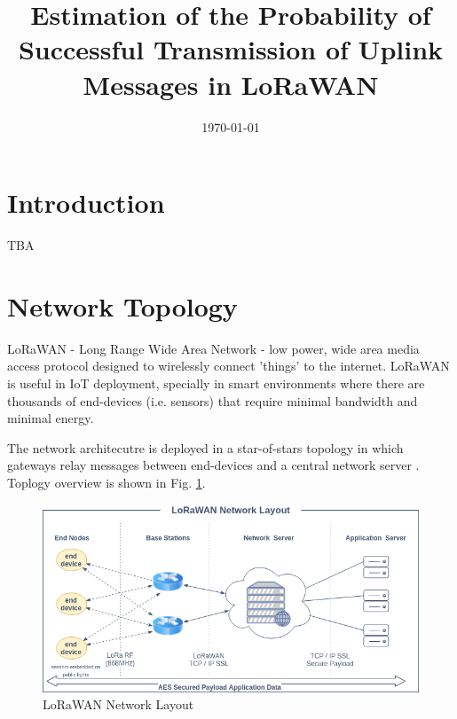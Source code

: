 \documentclass[11pt, a4paper]{article} %
\title{Estimation of the Probability of Successful Transmission of Uplink Messages in LoRaWAN} %
\author{
	\authorstyle{Ante Lojić Kapetanović}
	\newline\newline %
	\institution{University of Split, Split, Croatia}
}
\date{\today} %
\begin{document}
\maketitle %

\thispagestyle{firstpage} %




\section{Introduction}
TBA

\section{Network Topology}

LoRaWAN - Long Range Wide Area Network - low power, wide area media access protocol designed to wirelessly connect 'things' to the internet. LoRaWAN is useful in IoT deployment, specially in smart environments where there are thousands of end-devices (i.e. sensors) that require minimal bandwidth and minimal energy.

The network architecutre is deployed in a star-of-stars topology in which gateways relay messages between end-devices and a central network server \cite{Silva_LoRaWAN}.
Toplogy overview is shown in Fig. \ref{lorawan}.
\begin{figure}
	\includegraphics[width=\linewidth]{images/LoRaWAN-Network-Layout.png} %
	\caption{LoRaWAN Network Layout} %
	\label{lorawan} %
\end{figure}
\end{document}
